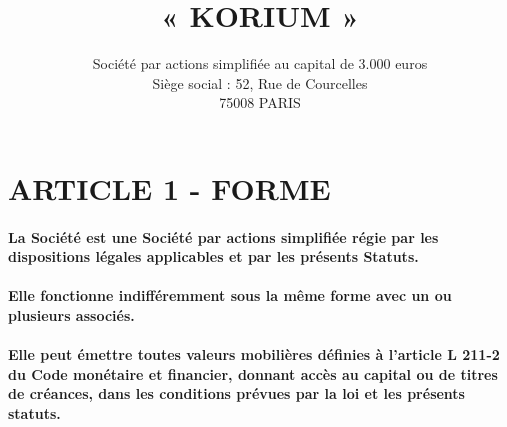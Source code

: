 \documentclass[a4paper, 11pt]{article}
\begin{document}
\title{« KORIUM »}
\author{
  Société par actions simplifiée au capital de 3.000 euros\\
  Siège social : 52, Rue de Courcelles\\
  75008 PARIS\\
}

\maketitle

\section*{ARTICLE 1 - FORME}

\paragraph{
  La Société est une Société par actions simplifiée régie par les dispositions  légales applicables et par les présents Statuts.
}

\paragraph{
  Elle fonctionne indifféremment sous la même forme avec un ou plusieurs associés.
}

\paragraph{
  Elle peut émettre toutes valeurs mobilières définies à l'article L 211-2 du Code monétaire et financier, donnant accès au capital ou de titres de créances, dans les conditions prévues par la loi et les présents statuts.
}
\end{document}
